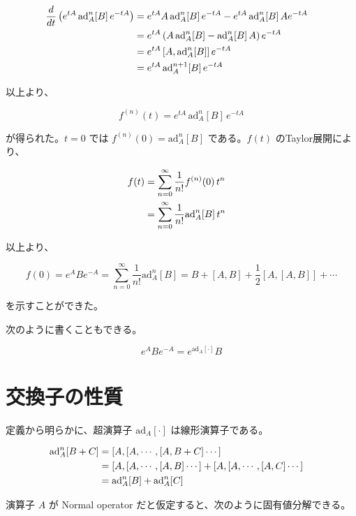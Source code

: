 \documentclass[a4paper, platex]{jsarticle}
\begin{document}
\begin{align}
\frac{d}{dt} \left( e^{tA} \,\mathrm{ad}_A^n[B]\,e^{-tA} \right) &= e^{tA} A\,\mathrm{ad}_A^n[B]\, e^{-tA} - e^{tA} \,\mathrm{ad}_A^n[B]\, A e^{-tA} \cr
  &= e^{tA} \left( A\,\mathrm{ad}_A^n[B]- \mathrm{ad}_A^n[B]\,A \right) e^{-tA} \cr
  &= e^{tA} \left[ A, \mathrm{ad}_A^n[B] \right] e^{-tA} \cr
  &= e^{tA}\,\mathrm{ad}_A^{n+1}[B]\,e^{-tA}
\end{align}

以上より、

\begin{equation}
f^{(n)}(t) = e^{tA} \,\mathrm{ad}_A^n[B]\,e^{-tA}
\end{equation}

が得られた。\(t=0\) では \(f^{(n)}(0) = \mathrm{ad}_A^n[B]\)
である。\(f(t)\) のTaylor展開により、

\begin{align}
f(t) &= \sum_{n=0}^\infty \frac{1}{n!} f^{(n)}(0) \, t^n \cr
  &= \sum_{n=0}^\infty \frac{1}{n!} \mathrm{ad}_A^n[B]\,t^n
\end{align}

以上より、

\begin{equation}
f(0) = e^{A} B e^{-A} = \sum_{n=0}^\infty \frac{1}{n!} \mathrm{ad}_A^n[B] = B + [A,B] + \frac{1}{2}[A, [A,B]] + \cdots
\end{equation}

を示すことができた。

次のように書くこともできる。

\begin{equation}
e^{A} B e^{-A} = e^{\mathrm{ad}_A [\cdot]} B
\end{equation}

\hypertarget{ux4ea4ux63dbux5b50ux306eux6027ux8cea}{%
\section{交換子の性質}\label{ux4ea4ux63dbux5b50ux306eux6027ux8cea}}

定義から明らかに、超演算子 \(\mathrm{ad}_A[\cdot]\) は線形演算子である。

\begin{align}
\mathrm{ad}_A^n[B+C] &= [A,[A,\cdots,[A,B+C]\cdots] \cr
  &= [A,[A,\cdots,[A,B]\cdots] + [A,[A,\cdots,[A,C]\cdots] \cr
  &= \mathrm{ad}_A^n[B] + \mathrm{ad}_A^n[C]
\end{align}

演算子 \(A\) が Normal operator
だと仮定すると、次のように固有値分解できる。
\end{document}
